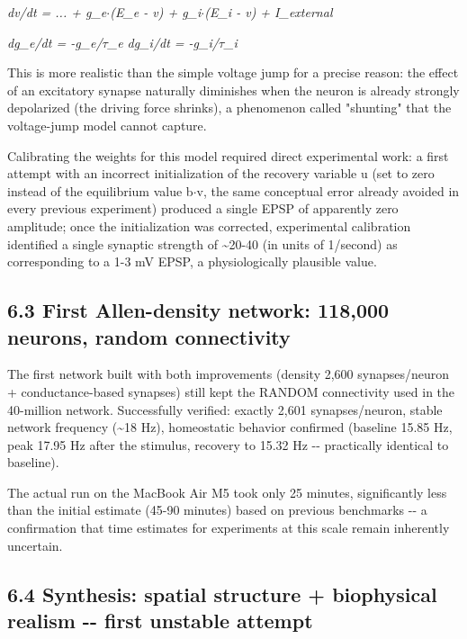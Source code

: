 \documentclass[
  english,
]{article}
\begin{document}
\emph{dv/dt = ... + g\_\allowbreak{}e$\cdot$(E\_\allowbreak{}e - v) + g\_\allowbreak{}i$\cdot$(E\_\allowbreak{}i - v) + I\_\allowbreak{}external}

\emph{dg\_\allowbreak{}e/dt = -g\_\allowbreak{}e/$\tau$\_\allowbreak{}e dg\_\allowbreak{}i/dt = -g\_\allowbreak{}i/$\tau$\_\allowbreak{}i}

This is more realistic than the simple voltage jump for a precise reason: the effect of an excitatory synapse naturally diminishes when the neuron is already strongly depolarized (the driving force shrinks), a phenomenon called "shunting" that the voltage-jump model cannot capture.

Calibrating the weights for this model required direct experimental work: a first attempt with an incorrect initialization of the recovery variable u (set to zero instead of the equilibrium value b$\cdot$v, the same conceptual error already avoided in every previous experiment) produced a single EPSP of apparently zero amplitude; once the initialization was corrected, experimental calibration identified a single synaptic strength of \textasciitilde20-40 (in units of 1/second) as corresponding to a 1-3 mV EPSP, a physiologically plausible value.

\subsection{6.3 First Allen-density network: 118,000 neurons, random connectivity}\label{first-allen-density-network-118000-neurons-random-connectivity}

The first network built with both improvements (density 2,600 synapses/neuron + conductance-based synapses) still kept the RANDOM connectivity used in the 40-million network. Successfully verified: exactly 2,601 synapses/neuron, stable network frequency (\textasciitilde18 Hz), homeostatic behavior confirmed (baseline 15.85 Hz, peak 17.95 Hz after the stimulus, recovery to 15.32 Hz -\/- practically identical to baseline).

The actual run on the MacBook Air M5 took only 25 minutes, significantly less than the initial estimate (45-90 minutes) based on previous benchmarks -\/- a confirmation that time estimates for experiments at this scale remain inherently uncertain.

\subsection{6.4 Synthesis: spatial structure + biophysical realism -\/- first unstable attempt}\label{synthesis-spatial-structure-biophysical-realism----first-unstable-attempt}
\end{document}
